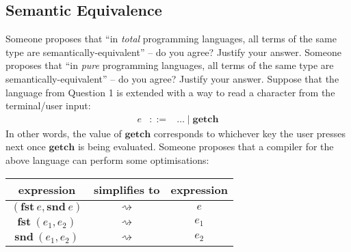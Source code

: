 \documentclass[10pt,a4paper]{exam} %
\begin{document}
\begin{questions}

\section*{Semantic Equivalence}

\question[2] Someone proposes that ``in \emph{total} programming languages, all terms of the same type are semantically-equivalent'' -- do you agree? Justify your answer. \droppoints
\question[2] Someone proposes that ``in \emph{pure} programming languages, all terms of the same type are semantically-equivalent'' -- do you agree? Justify your answer. \droppoints
\question Suppose that the language from Question 1 is extended with a way to read a character from the terminal/user input:
\begin{displaymath}
\begin{array}{lcl}
e & ::= & \ldots \mid \mathbf{getch}
\end{array}
\end{displaymath}
In other words, the value of $\mathbf{getch}$ corresponds to whichever key the user presses next once $\mathbf{getch}$ is being evaluated. Someone proposes that a compiler for the above language can perform some optimisations:
\begin{center}
\begin{tabular}{ccc}
 expression & simplifies to & expression \\ \hline 
 $(\mathbf{fst}~e, \mathbf{snd}~e)$ & $\rightsquigarrow$ & $e$ \\ 
 $\mathbf{fst}~(e_1,e_2)$ & $\rightsquigarrow$ & $e_1$ \\ 
 $\mathbf{snd}~(e_1,e_2)$ & $\rightsquigarrow$ & $e_2$ \\ 
\end{tabular} 
\end{center}
\begin{parts}

\end{parts}
\end{questions}
\end{document}
